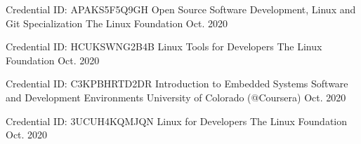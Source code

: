 

\begin{cventries}

  \cventry
  {Credential ID: APAKS5F5Q9GH}
  {Open Source Software Development, Linux and Git Specialization} %
  {The Linux Foundation} %
  {Oct. 2020} %
  {
  }

  \cventry
  {Credential ID: HCUKSWNG2B4B}
  {Linux Tools for Developers} %
  {The Linux Foundation} %
  {Oct. 2020} %
  {
  }

  \cventry
  {Credential ID: C3KPBHRTD2DR}
  {Introduction to Embedded Systems Software and Development Environments} %
  {University of Colorado (@Coursera)} %
  {Oct. 2020} %
  {
  }

  \cventry
  {Credential ID: 3UCUH4KQMJQN}
  {Linux for Developers} %
  {The Linux Foundation} %
  {Oct. 2020} %
  {
  }


\end{cventries}

